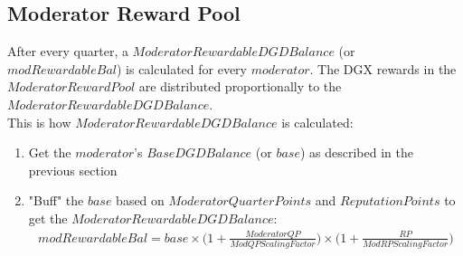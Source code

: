 \documentclass[11pt,a4paper,titlepage]{article}
\begin{document}
{	\subsection{Moderator Reward Pool}{
		After every quarter, a $Moderator Rewardable DGD Balance$ (or $modRewardableBal$) is calculated for every $moderator$. The DGX rewards in the $ModeratorRewardPool$ are distributed proportionally to the $Moderator Rewardable DGD Balance$.\\
		This is how $Moderator Rewardable DGD Balance$ is calculated:
		\begin{enumerate}
			\item Get the $moderator$'s $Base DGD Balance$ (or $base$) as described in the previous section
			\item "Buff" the $base$ based on $ModeratorQuarterPoints$ and $ReputationPoints$ to get the $Moderator Rewardable DGD Balance$:
			\begin{align*}
			modRewardableBal = base \times \Bigg( 1+\frac{ModeratorQP}{ModQPScalingFactor} \Bigg) \times \Bigg(1+\frac{RP}{ModRPScalingFactor} \Bigg)
			\end{align*}
		\end{enumerate}
	}
}
\end{document}
